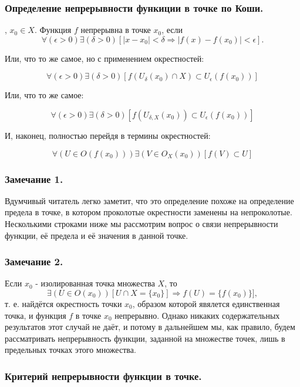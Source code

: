 \subsubsection{Определение непрерывности функиции в точке по Коши.}

\opred

\fXR, $x_0 \in X$.
Функция $f$ непрерывна в точке $x_0$, если
$$
\forall(\epsilon>0)\exists(\delta>0)[|x-x_0|<\delta \Rightarrow |f(x)-f(x_0)|<\epsilon].
$$

Или, что то же самое, но с применением окрестностей:

$$
\forall(\epsilon>0)\exists(\delta>0) [f(U_{\delta}(x_0) \cap X) \subset U_{\epsilon}(f(x_0))]
$$

Или, что то же самое:

$$
\forall(\epsilon>0)\exists(\delta>0) [f(U_{\delta,X}(x_0)) \subset U_{\epsilon}(f(x_0))]
$$

И, наконец, полностью перейдя в термины окрестностей:

$$
\forall(U \in O(f(x_0)))\exists(V \in O_X(x_0)) [f(V) \subset U]
$$

\subsubsection{Замечание 1.}

Вдумчивый читатель легко заметит, что это определение похоже на определение предела в точке, в котором проколотые окрестности заменены на непроколотые. Несколькими строками ниже мы рассмотрим вопрос о связи непрерывности функции, её предела и её значения в данной точке.

\subsubsection{Замечание 2.}

Если $x_0$ - изолированная точка множества $X$, то
$$
 \exists(U \in O(x_0))[U \cap X = \{x_0\}] \Rightarrow f(U)=\{f(x_0)\}],
$$
т. е. найдётся окрестность точки $x_0$, образом которой явялется единственная точка, и функция $f$ в точке $x_0$ непрерывно. Однако никаких содержательных результатов этот случай не даёт, и потому в дальнейшем мы, как правило, будем рассматривать непрерывность функции, заданной на множестве точек, лишь в предельных точках этого множества.

\subsubsection{Критерий непрерывности функции в точке.}

